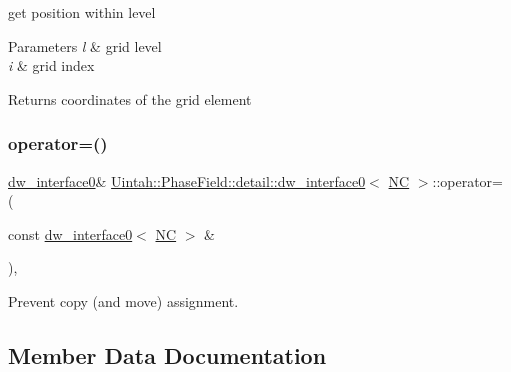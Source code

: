 get position within level 


\begin{DoxyParams}{Parameters}
{\em l} & grid level \\
\hline
{\em i} & grid index \\
\hline
\end{DoxyParams}
\begin{DoxyReturn}{Returns}
coordinates of the grid element 
\end{DoxyReturn}
\mbox{\label{classUintah_1_1PhaseField_1_1detail_1_1dw__interface0_3_01NC_01_4_af04801048a103c1b86d4d90f5d74a61a}} 
\subsubsection{\texorpdfstring{operator=()}{operator=()}}
{\footnotesize\ttfamily \hyperlink{classUintah_1_1PhaseField_1_1detail_1_1dw__interface0}{dw\+\_\+interface0}\& \hyperlink{classUintah_1_1PhaseField_1_1detail_1_1dw__interface0}{Uintah\+::\+Phase\+Field\+::detail\+::dw\+\_\+interface0}$<$ \hyperlink{namespaceUintah_1_1PhaseField_a33d355affda78a83f45755ba8388cedda77924170fe82bfd58b74ca3e44139718}{NC} $>$\+::operator= (\begin{DoxyParamCaption}\item[{const \hyperlink{classUintah_1_1PhaseField_1_1detail_1_1dw__interface0}{dw\+\_\+interface0}$<$ \hyperlink{namespaceUintah_1_1PhaseField_a33d355affda78a83f45755ba8388cedda77924170fe82bfd58b74ca3e44139718}{NC} $>$ \&}]{ }\end{DoxyParamCaption})\hspace{0.3cm}{\ttfamily [protected]}, {\ttfamily [delete]}}



Prevent copy (and move) assignment. 



\subsection{Member Data Documentation}
\mbox{\label{classUintah_1_1PhaseField_1_1detail_1_1dw__interface0_3_01NC_01_4_a18732f33999dc6af8676c280847d717a}} 
